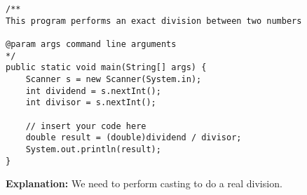 \begin{enumerate}
\begin{lstlisting}
/**
This program performs an exact division between two numbers

@param args command line arguments
*/
public static void main(String[] args) {
    Scanner s = new Scanner(System.in);
    int dividend = s.nextInt();
    int divisor = s.nextInt();
    
    // insert your code here
    double result = (double)dividend / divisor;
    System.out.println(result);
}
\end{lstlisting}

\textbf{Explanation: } \Ans We need to perform casting to do a real division.


\end{enumerate}